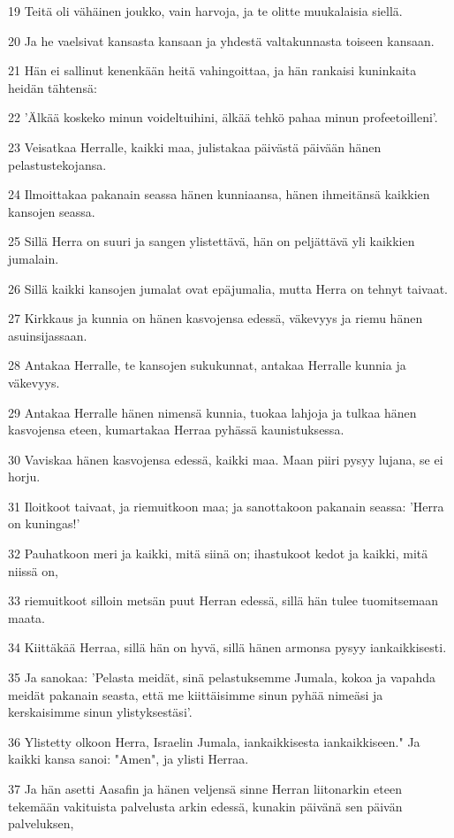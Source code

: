 \par 19 Teitä oli vähäinen joukko, vain harvoja, ja te olitte muukalaisia siellä.
\par 20 Ja he vaelsivat kansasta kansaan ja yhdestä valtakunnasta toiseen kansaan.
\par 21 Hän ei sallinut kenenkään heitä vahingoittaa, ja hän rankaisi kuninkaita heidän tähtensä:
\par 22 'Älkää koskeko minun voideltuihini, älkää tehkö pahaa minun profeetoilleni'.
\par 23 Veisatkaa Herralle, kaikki maa, julistakaa päivästä päivään hänen pelastustekojansa.
\par 24 Ilmoittakaa pakanain seassa hänen kunniaansa, hänen ihmeitänsä kaikkien kansojen seassa.
\par 25 Sillä Herra on suuri ja sangen ylistettävä, hän on peljättävä yli kaikkien jumalain.
\par 26 Sillä kaikki kansojen jumalat ovat epäjumalia, mutta Herra on tehnyt taivaat.
\par 27 Kirkkaus ja kunnia on hänen kasvojensa edessä, väkevyys ja riemu hänen asuinsijassaan.
\par 28 Antakaa Herralle, te kansojen sukukunnat, antakaa Herralle kunnia ja väkevyys.
\par 29 Antakaa Herralle hänen nimensä kunnia, tuokaa lahjoja ja tulkaa hänen kasvojensa eteen, kumartakaa Herraa pyhässä kaunistuksessa.
\par 30 Vaviskaa hänen kasvojensa edessä, kaikki maa. Maan piiri pysyy lujana, se ei horju.
\par 31 Iloitkoot taivaat, ja riemuitkoon maa; ja sanottakoon pakanain seassa: 'Herra on kuningas!'
\par 32 Pauhatkoon meri ja kaikki, mitä siinä on; ihastukoot kedot ja kaikki, mitä niissä on,
\par 33 riemuitkoot silloin metsän puut Herran edessä, sillä hän tulee tuomitsemaan maata.
\par 34 Kiittäkää Herraa, sillä hän on hyvä, sillä hänen armonsa pysyy iankaikkisesti.
\par 35 Ja sanokaa: 'Pelasta meidät, sinä pelastuksemme Jumala, kokoa ja vapahda meidät pakanain seasta, että me kiittäisimme sinun pyhää nimeäsi ja kerskaisimme sinun ylistyksestäsi'.
\par 36 Ylistetty olkoon Herra, Israelin Jumala, iankaikkisesta iankaikkiseen." Ja kaikki kansa sanoi: "Amen", ja ylisti Herraa.
\par 37 Ja hän asetti Aasafin ja hänen veljensä sinne Herran liitonarkin eteen tekemään vakituista palvelusta arkin edessä, kunakin päivänä sen päivän palveluksen,
